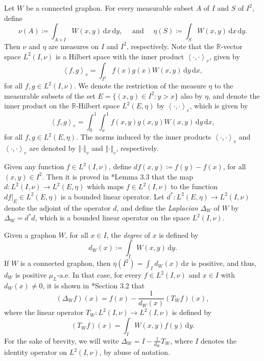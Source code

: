 \documentclass[12pt,a4paper,bold]{thesis}
\theoremstyle{definition}
\newcommand*{\map}[3]{#1 \colon #2 \to #3}
\newcommand*{\ip}[2]{\left\langle #1 , #2 \right\rangle}
\newcommand*{\norm}[2][]{\left\Vert #2 \right\Vert_{#1}}
\begin{document}
Let $W$ be a connected graphon. For every measurable subset $A$ of $I$ and 
$S$ of $I^2$, define
\begin{equation*}
    \nu(A) \coloneq \int_{A \times I} W(x,y)\, \mathrm{d}x\, \mathrm{d}y, 
    \quad \text{ and } \quad
    \eta(S) \coloneq \int_{S} W(x,y)\, \mathrm{d}x\, \mathrm{d}y.
\end{equation*}
Then $\nu$ and $\eta$ are measures on $I$ and $I^2$, respectively. 
Note that the $\mathbb{R}$-vector space $L^2(I, \nu)$ is a Hilbert space with 
the inner product $\ip{\cdot}{\cdot}_v$, given by
\begin{equation*}
    \ip{f}{g}_v = \int_{I^2} f(x) g(x) W(x,y)\, \mathrm{d}y\, \mathrm{d}x,
\end{equation*}
for all $f,g \in L^2(I, \nu)$. We denote the restriction of the measure $\eta$
to the measurable subsets of the set $E = \{(x,y) \in I^2 : y > x\}$ also by $\eta$, 
and denote the inner product on the $\mathbb{R}$-Hilbert space $L^2(E, \eta)$
by $\ip{\cdot}{\cdot}_e$, which is given by
\begin{equation*}
    \ip{f}{g}_e = \int_0^1 \int_{x}^{1} f(x,y) g(x,y) W(x,y)\, \mathrm{d}y\, \mathrm{d}x,
\end{equation*}
for all $f, g \in L^2(E, \eta)$. The norms induced by the inner products 
$\ip{\cdot}{\cdot}_v$ and $\ip{\cdot}{\cdot}_e$ are denoted by $\norm[v]{\cdot}$
and $\norm[e]{\cdot}$, respectively.

Given any function $f \in L^2(I, \nu)$, define $df(x,y) \coloneq f(y) - f(x)$,
for all $(x,y) \in I^2$. Then it is proved in \cite{Abhishek-Mahan24}*{Lemma 3.3} that
the map $\map{d}{L^2(I, \nu)}{L^2(E, \eta)}$ which maps $f \in L^2(I, \nu)$ to 
the function $df|_E \in L^2(E, \eta)$ is a bounded linear operator. 
Let $\map{d^*}{L^2(E, \eta)}{L^2(I, \nu)}$ denote the adjoint of the operator $d$,
and define the \emph{Laplacian} $\Delta_W$ of $W$ by $\Delta_W = d^*d$, 
which is a bounded linear operator on the space $L^2(I, \nu)$. 

Given a graphon $W$, for all $x \in I$, the \emph{degree} of $x$ is defined by
\begin{equation*}
    d_W(x) \coloneq \int_I W(x,y)\, \mathrm{d}y.
\end{equation*}
If $W$ is a connected graphon, then $\eta(I^2) = \int_I d_W(x)\, \mathrm{d}x$ is positive,
and thus, $d_W$ is positive $\mu_L$-a.e. 
In that case, for every $f \in L^2(I,\nu)$ and $x \in I$ with $d_W(x) \neq 0$,
it is shown in \cite{Abhishek-Mahan24}*{Section 3.2} that
\begin{equation*}
    (\Delta_W f)(x) = f(x) - \frac{1}{d_W(x)} (T_W f)(x),
\end{equation*}
where the linear operator $\map{T_W}{L^2(I,\nu)}{L^2(I,\nu)}$ is defined by
\begin{equation*}
    (T_W f)(x) = \int_I W(x,y) f(y)\, \mathrm{d}y.
\end{equation*}
For the sake of brevity, we will write $\Delta_W = I - \frac{1}{d_W} T_W$,
where $I$ denotes the identity operator on $L^2(I,\nu)$, by abuse of notation.
\end{document}
